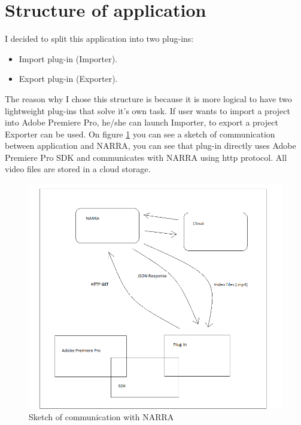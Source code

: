 \documentclass[thesis=B,english]{FITthesis}[2012/10/20]
\begin{document}
\section{Structure of application}
I decided to split this application into two plug-ins:
	\begin{itemize}
		\item Import plug-in (Importer).
		\item Export plug-in (Exporter).
	\end{itemize}
The reason why I chose this structure is because it is more logical to have two lightweight plug-ins that solve it's own task. If user wants to import a project into Adobe Premiere Pro, he/she can launch Importer, to export a project Exporter can be used. On figure \ref{fig:narrastruct} you can see a sketch of communication between application and NARRA, you can see that plug-in directly uses Adobe Premiere Pro SDK and communicates with NARRA using http protocol. All video files are stored in a cloud storage.
	\begin{figure}
		\centering
		\includegraphics[width=1\textwidth]{StructureofNARRA.png}
		\caption{Sketch of communication with NARRA}\label{fig:narrastruct}
	\end{figure}
\end{document}
